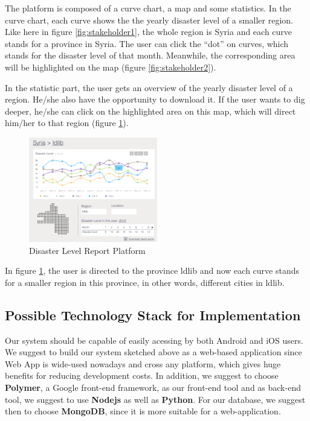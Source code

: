 The platform is composed of a curve chart,
a map and some statistics.
In the curve chart,
each curve shows the the yearly disaster level of a smaller region.
Like here in figure \ref{fig:stakeholder1}, 
the whole region is Syria and each curve stands for a province in Syria.
The user can click the ``dot'' on curves,
which stands for the disaster level of that month.
Meanwhile, the corresponding area will be highlighted on the map (figure \ref{fig:stakeholder2}).

In the statistic part,
the user gets an overview of the yearly disaster level of a region.
He/she also have the opportunity to download it.
If the user wants to dig deeper, 
he/she can click on the highlighted area on this map,
which will direct him/her to that region (figure \ref{fig:stakeholder3}).

\begin{figure}[H]
\centering
\includegraphics[width=0.5\textwidth]{figures/function-stakeholder-3}
\caption{Disaster Level Report Platform}
\label{fig:stakeholder3}
\end{figure}

In figure \ref{fig:stakeholder3},
the user is directed to the province ldlib and now each curve stands for a smaller region in this province,
in other words, different cities in ldlib.
    
\subsection{Possible Technology Stack for Implementation}

Our system should be capable of easily acessing by both Android and iOS users.
We suggest to build our system sketched above as a web-based application 
since Web App is wide-used nowadays and cross any platform, which gives huge benefits for 
reducing development costs. 
In addition, we suggest to choose \textbf{Polymer}, a Google front-end framework, 
as our front-end tool and as back-end tool, we suggest to use \textbf{Nodejs} as well as \textbf{Python}.
For our database, we suggest then to choose \textbf{MongoDB}, since it is more suitable for a web-application.